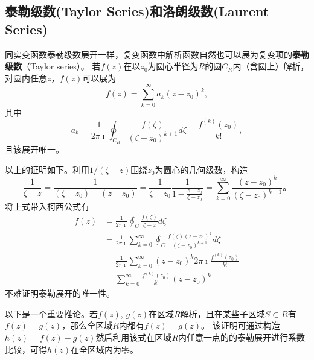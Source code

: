 \subsection{泰勒级数(Taylor Series)和洛朗级数(Laurent Series)}
\label{subsec:taylor_laurent_series}
同实变函数泰勒级数展开一样，复变函数中解析函数自然也可以展为复变项的\textbf{泰勒级数}（Taylor series）。
若$f(z)$在以$z_0$为圆心半径为$R$的圆$C_R$内（含圆上）解析，对圆内任意$z$，$f(z)$可以展为
\begin{equation}
    f(z) = \sum_{k=0}^{\infty} a_k (z-z_0)^k,
\end{equation}
其中
\begin{equation}
    a_k=\frac{1}{2 \pi \imath} \oint_{C_{R}} \frac{f(\zeta)}{\left(\zeta-z_0\right)^{k+1}} d \zeta
    =\frac{f^{(k)}\left(z_0\right)}{k !} ,
\end{equation}
且该展开唯一。

以上的证明如下。利用$1/(\zeta -z)$围绕$z_0$为圆心的几何级数，构造
\[
\frac{1}{\zeta -z} = \frac{1}{(\zeta -z_0) - (z - z_0)} = \frac{1}{\zeta - z_0}\frac{1}{ 1 - \frac{z-z_0}{\zeta - z_0}}
 = \sum_{k=0}^{\infty}\frac{(z-z_0)^k}{(\zeta - z_0)^{k+1}}。    
\]
将上式带入柯西公式有
\begin{equation}
    \begin{aligned}
        f(z) &= \frac{1}{2\pi \imath} \oint_C \frac{f(\zeta)}{\zeta - z} d \zeta
        \\
        &= \frac{1}{2\pi \imath} \sum_{k=0} ^{\infty} \oint_C \frac{f(\zeta)(z-z_0)^k}{(\zeta - z_0)^{k+1}} d \zeta
        \\
        &= \frac{1}{2\pi \imath} \sum_{k=0} ^{\infty}(z-z_0)^k 2\pi \imath \frac{f^{(k)}(z_0)}{k!}
        \\
        & = \sum_{k=0} ^{\infty}  \frac{f^{(k)}(z_0)}{k!} (z-z_0)^k
    \end{aligned}
\end{equation}
不难证明泰勒展开的唯一性。

以下是一个重要推论。若$f(z)$, $g(z)$在区域$R$解析，且在某些子区域$S\subset R$有$f(z)=g(z)$，那么全区域$R$内都有$f(z)=g(z)$。
该证明可通过构造$h(z) = f(z) - g(z)$然后利用该式在区域$R$内任意一点的的泰勒展开进行系数比较，可得$h(z)$在全区域内为零。

